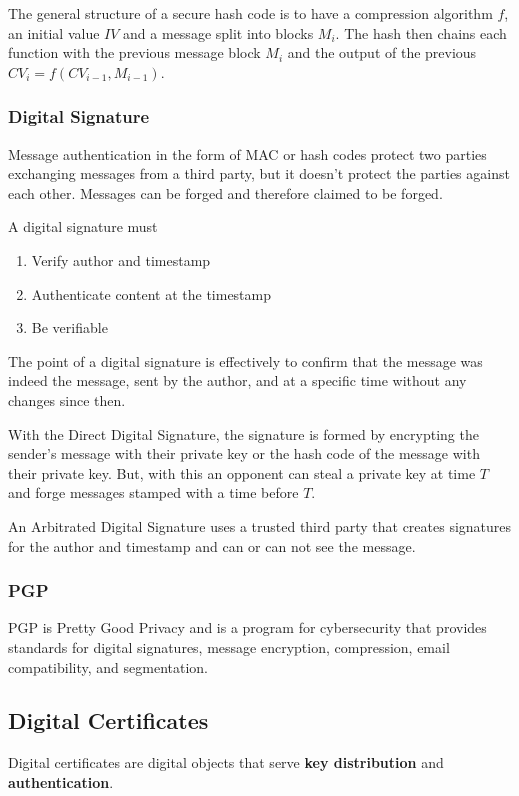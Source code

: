 \documentclass[11pt]{article}
\begin{document}
The general structure of a secure hash code is to have a compression algorithm $f$, an initial value $IV$ and a message split into blocks $M_i$.
The hash then chains each function with the previous message block $M_i$ and the output of the previous $CV_{i} = f(CV_{i-1}, M_{i-1})$.

\subsubsection{Digital Signature}
Message authentication in the form of MAC or hash codes protect two parties exchanging messages from a third party, but it doesn't protect the parties against each other.
Messages can be forged and therefore claimed to be forged.

A digital signature must
\begin{enumerate}
    \item Verify author and timestamp
    \item Authenticate content at the timestamp
    \item Be verifiable
\end{enumerate}

The point of a digital signature is effectively to confirm that the message was indeed the message, sent by the author, and at a specific time without any changes since then.

With the Direct Digital Signature,  the signature is formed by encrypting the sender's message with their private key or the hash code of the message with their private key.
But, with this an opponent can steal a private key at time $T$ and forge messages stamped with a time before $T$.

An Arbitrated Digital Signature uses a trusted third party that creates signatures for the author and timestamp and can or can not see the message.
\subsubsection{PGP}
PGP is Pretty Good Privacy and is a program for cybersecurity that provides standards for digital signatures, message encryption, compression, email compatibility, and segmentation.

\subsection{Digital Certificates}
Digital certificates are digital objects that serve \textbf{key distribution} and \textbf{authentication}.
\end{document}
